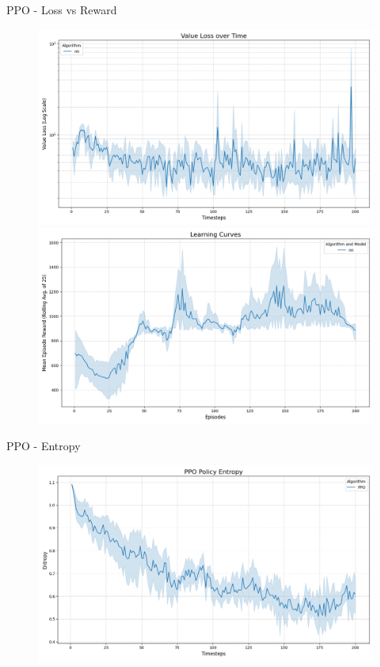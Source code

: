 \documentclass[serif]{beamer}  %
\begin{document}
\begin{frame}{PPO - Loss vs Reward}
    \begin{figure}
        \centering
        \includegraphics[width=0.48\linewidth]{plots/ppo_value_loss_curve.png}
        \hfill
        \includegraphics[width=0.48\linewidth]{plots/ppo_reward_curve.png}
    \end{figure}
\end{frame}

\begin{frame}{PPO - Entropy}
    \begin{figure}
        \centering
        \includegraphics[width=\linewidth]{../plots/ppo_entropy_curve.png}
    \end{figure}
\end{frame}
\end{document}
